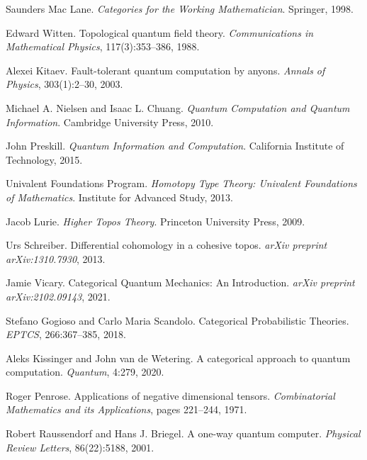 \documentclass[11pt,a4paper]{article}
\begin{document}
\begin{thebibliography}{99}
Saunders Mac Lane.
\newblock \emph{Categories for the Working Mathematician}.
\newblock Springer, 1998.

Edward Witten.
\newblock Topological quantum field theory.
\newblock \emph{Communications in Mathematical Physics}, 117(3):353--386, 1988.

Alexei Kitaev.
\newblock Fault-tolerant quantum computation by anyons.
\newblock \emph{Annals of Physics}, 303(1):2--30, 2003.

Michael A. Nielsen and Isaac L. Chuang.
\newblock \emph{Quantum Computation and Quantum Information}.
\newblock Cambridge University Press, 2010.

John Preskill.
\newblock \emph{Quantum Information and Computation}.
\newblock California Institute of Technology, 2015.

{Univalent Foundations Program}.
\newblock \emph{Homotopy Type Theory: Univalent Foundations of Mathematics}.
\newblock Institute for Advanced Study, 2013.

Jacob Lurie.
\newblock \emph{Higher Topos Theory}.
\newblock Princeton University Press, 2009.

Urs Schreiber.
\newblock Differential cohomology in a cohesive topos.
\newblock \emph{arXiv preprint arXiv:1310.7930}, 2013.

Jamie Vicary.
\newblock Categorical Quantum Mechanics: An Introduction.
\newblock \emph{arXiv preprint arXiv:2102.09143}, 2021.

Stefano Gogioso and Carlo Maria Scandolo.
\newblock Categorical Probabilistic Theories.
\newblock \emph{EPTCS}, 266:367--385, 2018.

Aleks Kissinger and John van de Wetering.
\newblock A categorical approach to quantum computation.
\newblock \emph{Quantum}, 4:279, 2020.

Roger Penrose.
\newblock Applications of negative dimensional tensors.
\newblock \emph{Combinatorial Mathematics and its Applications}, pages 221--244, 1971.

Robert Raussendorf and Hans J. Briegel.
\newblock A one-way quantum computer.
\newblock \emph{Physical Review Letters}, 86(22):5188, 2001.


\end{thebibliography}
\end{document}
